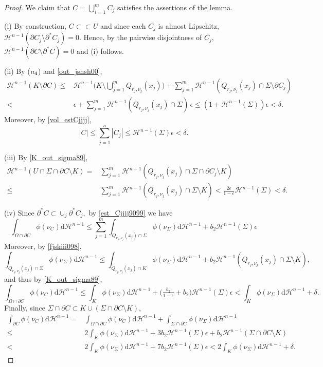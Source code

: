 \documentclass[reqno]{amsart}
\numberwithin{equation}{section}
\theoremstyle{plain}
\theoremstyle{definition}
\newcommand{\cH}{\mathcal{H}}
\newcommand{\p}{\partial}
\newcommand{\cl}[1]{\overline{#1}}
\newcommand{\bound}{b}
\renewcommand{\d}{\mathrm{d}}
\newcommand{\strictlyincluded}{\subset\subset}
\begin{document}
\begin{proof}
We claim that $C= \bigcup_{i=1}^m C_j$ satisfies the assertions of the lemma.

(i) By construction, $C\strictlyincluded U$ and since each $C_j$ is almost Lipschitz, $\cH^{n-1}(\p C_j\setminus \p^*C_j)=0.$ Hence, by the pairwise disjointness of $\cl{C_j},$ $\cH^{n-1}(\p C\setminus \p^*C)=0$ and (i) follows.

(ii) By ($\rm a_4$) and \eqref{out_jshsh00},
\begin{align*}
\cH^{n-1}(K\setminus \p C) \le & \cH^{n-1}\Big(K\setminus \bigcup_{j=1}^m Q_{r_j,\nu_j}(x_j)\Big) + 
\sum\limits_{j=1}^m \cH^{n-1}( Q_{r_j,\nu_j}(x_j)\cap \Sigma  \setminus \p C_j) \\
< & \epsilon +  \sum\limits_{j=1}^m \cH^{n-1}( Q_{r_j,\nu_j}(x_j) \cap\Sigma)\,\epsilon \le
(1+\cH^{n-1}(\Sigma))\epsilon <\delta.
\end{align*}
Moreover, by \eqref{vol_estCjjjj},
$$
|C| \le \sum\limits_{j=1}^n |C_j| \le \cH^{n-1}(\Sigma)\epsilon <\delta.
$$


(iii) By \eqref{K_out_sigma89},
\begin{align*}
\cH^{n-1}( U\cap\Sigma\cap \p C \setminus K) = & \sum\limits_{j=1}^m \cH^{n-1}(Q_{r_j,\nu_j}(x_j)\cap \Sigma\cap \p C_j \setminus K) \\
\le & \sum\limits_{j=1}^m \cH^{n-1}(Q_{r_j,\nu_j}(x_j)\cap \Sigma\setminus K) <\frac{2\epsilon}{1-\epsilon}\cH^{n-1}(\Sigma) <\delta.
\end{align*}

(iv) Since $\p^* C\subset \cup_j \p^* C_j,$ by \eqref{est_Cjjjj9099} we have
$$
\int_{\Omega\cap\p C} \phi(\nu_C)\d\cH^{n-1} 
\le \sum\limits_{j=1}^m \int_{Q_{r_j,\nu_j}(x_j)\cap\Sigma}\phi(\nu_\Sigma)\d\cH^{n-1} + \bound_2\cH^{n-1}(\Sigma)\epsilon
$$
Moreover, by \eqref{fjskiii098},
$$
\int_{Q_{r_j,\nu_j}(x_j)\cap\Sigma}\phi(\nu_\Sigma)\d\cH^{n-1} \le 
\int_{Q_{r_j,\nu_j}(x_j)\cap K} \phi(\nu_\Sigma)\d\cH^{n-1} + \bound_2 \cH^{n-1}(Q_{r_j,\nu_j}(x_j)\cap \Sigma\setminus K),
$$
and thus by \eqref{K_out_sigma89},
$$
\int_{\Omega\cap\p C} \phi(\nu_C)\d\cH^{n-1}  
\le 
\int_K \phi(\nu_\Sigma)\d\cH^{n-1} + \Big(\tfrac{\bound_2}{1-\epsilon} + \bound_2) \cH^{n-1}(\Sigma)\epsilon < \int_K \phi(\nu_\Sigma)\d\cH^{n-1} +\delta.
$$
Finally, since $\Sigma\cap \p C\subset K\cup (\Sigma\cap \p C\setminus K),$  
\begin{align*}
\int_{\p C} \phi(\nu_C)\d\cH^{n-1} = & \int_{\Omega\cap\p C} \phi(\nu_C)\d\cH^{n-1} + \int_{\Sigma\cap \p C} \phi(\nu_\Sigma)\d\cH^{n-1}\\
\le & 2\int_K\phi(\nu_\Sigma)\d\cH^{n-1} + 3\bound_2\cH^{n-1}(\Sigma) \epsilon + 
\bound_2\cH^{n-1}(\Sigma\cap \p C\setminus K)\\
< & 2\int_K\phi(\nu_\Sigma)\d\cH^{n-1} + 7\bound_2\cH^{n-1}(\Sigma) \epsilon 
< 2\int_K \phi(\nu_\Sigma)\d\cH^{n-1} +\delta. 
\end{align*}
\end{proof}
\end{document}
